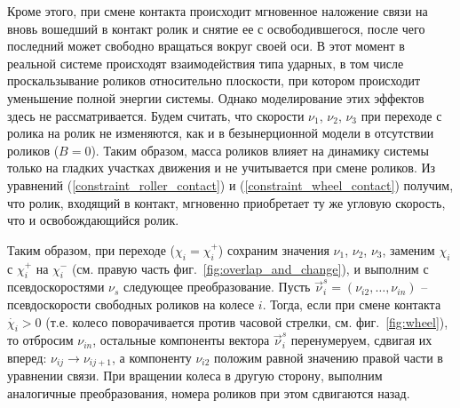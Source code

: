 Кроме этого, при смене контакта происходит мгновенное наложение связи на вновь вошедший в контакт ролик и снятие ее с освободившегося, после чего последний может свободно вращаться вокруг своей оси. В этот момент в реальной системе происходят взаимодействия типа ударных, в том числе проскальзывание роликов относительно плоскости, при котором происходит уменьшение полной энергии системы. Однако моделирование этих эффектов здесь не рассматривается. Будем считать, что скорости $\nu_1$, $\nu_2$, $\nu_3$ при переходе с ролика на ролик не изменяются, как и в безынерционной модели в отсутствии роликов ($B = 0$).  Таким образом, масса роликов влияет на динамику системы только на гладких участках движения и не учитывается при смене роликов. Из уравнений (\ref{constraint_roller_contact}) и (\ref{constraint_wheel_contact}) получим, что ролик, входящий в контакт, мгновенно приобретает ту же угловую скорость, что и освобождающийся ролик.

Таким образом, при переходе ($\chi_i = \chi_i^+$) сохраним значения $\nu_1$, $\nu_2$, $\nu_3$, заменим $\chi_i$ с $\chi_i^+$ на $\chi_i^-$ (см. правую часть фиг.~\ref{fig:overlap_and_change}), и выполним с псевдоскоростями $\nu_s$ следующее преобразование. Пусть $\vec{\nu}_i^s = (\nu_{i2},\ldots,\nu_{in})$ -- псевдоскорости свободных роликов на колесе $i$. Тогда, если при смене контакта $\dot{\chi_i} > 0$ (т.е. колесо поворачивается против часовой стрелки, см. фиг.~\ref{fig:wheel}), то отбросим $\nu_{in}$, остальные компоненты вектора $\vec{\nu}_i^s$ перенумеруем, сдвигая их вперед: $\nu_{ij} \rightarrow \nu_{ij+1}$, а компоненту $\nu_{i2}$ положим равной значению правой части в уравнении связи. При вращении колеса в другую сторону, выполним аналогичные преобразования, номера роликов при этом сдвигаются назад.
